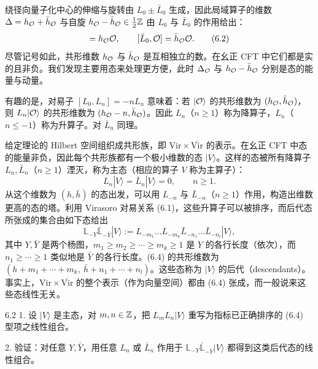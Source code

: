  绕径向量子化中心的伸缩与旋转由 $L_0\pm\bar L_0$ 生成，因此局域算子的维数 $\Delta=h_{\mathcal{O}}+\bar h_{\mathcal{O}}$ 与自旋 $h_{\mathcal{O}}-\bar h_{\mathcal{O}}\in\frac{1}{2}\mathbb{Z}$ 由 $L_0$ 与 $\bar L_0$ 的作用给出：
\begin{equation}
  [L_0,\cO] = h_\cO\cO,\qquad [\bar L_0,\cO]=\bar h_\cO\cO.
  \tag{6.2}
\end{equation}
尽管记号如此，共形维数 $h_{\mathcal{O}}$ 与 $\bar h_{\mathcal{O}}$ 是互相独立的数。在幺正 CFT 中它们都是实的且非负。我们发现主要用态来处理更方便，此时 $\Delta_{\mathcal{O}}$ 与 $h_{\mathcal{O}}-\bar h_{\mathcal{O}}$ 分别是态的能量与动量。

有趣的是，对易子 $[L_0,L_n]=-nL_n$ 意味着：若 $|\mathcal{O}\rangle$ 的共形维数为 $(h_{\mathcal{O}},\bar h_{\mathcal{O}})$，则 $L_n|\mathcal{O}\rangle$ 的共形维数为 $(h_{\mathcal{O}}-n,\bar h_{\mathcal{O}})$。因此 $L_n$（$n\ge1$）称为降算子，$L_n$（$n\le-1$）称为升算子。对 $\bar L_n$ 同理。

 给定理论的 Hilbert 空间组织成共形族，即 $\mathrm{Vir}\times\overline{\mathrm{Vir}}$ 的表示。在幺正 CFT 中态的能量非负，因此每个共形族都有一个极小维数的态 $|V\rangle$。这样的态被所有降算子 $L_n,\bar L_n$（$n\ge1$）湮灭，称为主态（相应的算子 $V$ 称为主算子）：
\begin{equation}
  L_n|V\rangle = \bar L_n|V\rangle = 0,\qquad n\ge1.
  \tag{6.3}
\end{equation}
从这个维数为 $(h,\bar h)$ 的态出发，可以用 $L_{-n}$ 与 $\bar L_{-n}$（$n\ge1$）作用，构造出维数更高的态的塔。利用 Virasoro 对易关系 (6.1)，这些升算子可以被排序，而后代态所张成的集合由如下态给出
\begin{equation}
  \mathbb{L}_{-Y}\bar{\mathbb{L}}_{-\bar Y}|V\rangle := L_{-m_1}\dots L_{-m_k}\bar L_{-n_1}\dots\bar L_{-n_l}|V\rangle,
  \tag{6.4}
\end{equation}
其中 $Y,\bar Y$ 是两个杨图，$m_1\ge m_2\ge\cdots\ge m_k\ge1$ 是 $Y$ 的各行长度（依次），而 $n_1\ge\cdots\ge1$ 类似地是 $\bar Y$ 的各行长度。(6.4) 的共形维数为 $(h+m_1+\cdots+m_k,\ \bar h+n_1+\cdots+n_l)$。这些态称为 $|V\rangle$ 的后代（descendants）。事实上，$\mathrm{Vir}\times\overline{\mathrm{Vir}}$ 的整个表示（作为向量空间）都由 (6.4) 张成，而一般说来这些态线性无关。

\begin{exercise}{6.2}
1. 设 $|V\rangle$ 是主态，对 $m,n\in\mathbb{Z}$，把 $L_mL_n|V\rangle$ 重写为指标已正确排序的 (6.4) 型项之线性组合。

2. 验证：对任意 $Y,\bar Y$，用任意 $L_n$ 或 $\bar L_n$ 作用于 $\mathbb{L}_{-Y}\bar{\mathbb{L}}_{-\bar Y}|V\rangle$ 都得到这类后代态的线性组合。
\end{exercise}

